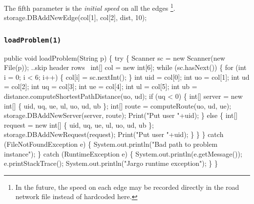 \documentclass{article}
\def\nwendcode{\endtrivlist \endgroup}      %
\let\nwdocspar=\par
\begin{document}
The fifth parameter is the \textit{initial speed} on all the edges \footnote{In
the future, the speed on each edge may be recorded directly in the road network
file instead of hardcoded here.}.
\nwenddocs{}\endmoddef{}
storage.DBAddNewEdge(col[1], col[2], dist, 10);
\nwendcode{}\nwdocspar

\subsubsection{{\tt{}\protect{}loadProblem(1)}}
\nwenddocs{}\endmoddef{}
public void loadProblem(String p) \{
  try \{
    Scanner sc = new Scanner(new File(p));
    \LA{}..skip header rows~{\nwtagstyle{}}\RA{}
    int[] col = new int[6];
    while (sc.hasNext()) \{
      for (int i = 0; i < 6; i++) \{
        col[i] = sc.nextInt();
      \}
      int uid = col[0];
      int uo = col[1];
      int ud = col[2];
      int uq = col[3];
      int ue = col[4];
      int ul = col[5];
      int ub = distance.computeShortestPathDistance(uo, ud);
      if (uq < 0) \{
        int[] server = new int[] \{ uid, uq, ue, ul, uo, ud, ub \};
        int[] route = computeRoute(uo, ud, ue);
        storage.DBAddNewServer(server, route);
        Print("Put user "+uid);
      \} else \{
        int[] request = new int[] \{ uid, uq, ue, ul, uo, ud, ub \};
        storage.DBAddNewRequest(request);
        Print("Put user "+uid);
      \}
    \}
  \} catch (FileNotFoundException e) \{
    System.out.println("Bad path to problem instance");
  \} catch (RuntimeException e) \{
    System.out.println(e.getMessage());
    e.printStackTrace();
    System.out.println("Jargo runtime exception");
  \}
\}
\eatline
{}\nwendcode{}\endmoddef{}
\end{document}
